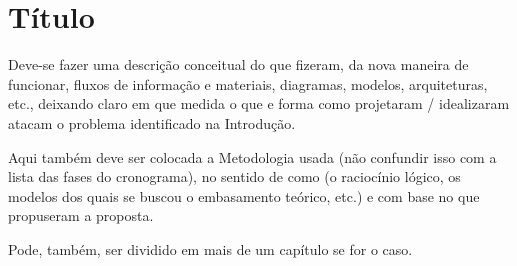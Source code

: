 \chapter{Título}

Deve-se fazer uma descrição conceitual do que fizeram, da nova maneira de funcionar, fluxos de informação e materiais, diagramas, modelos, arquiteturas, etc., deixando claro em que medida o que e forma como projetaram / idealizaram atacam o problema identificado na Introdução. 


Aqui também deve ser colocada a Metodologia usada (não confundir isso com a lista das fases do cronograma), no sentido de como (o raciocínio lógico, os modelos dos quais se buscou o embasamento teórico, etc.) e com base no que propuseram a proposta.


Pode, também, ser dividido em mais de um capítulo se for o caso.
